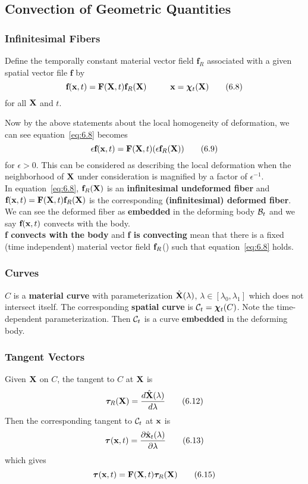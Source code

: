 \documentclass{article}
\newcommand{\Chi}{\boldsymbol{\chi}}
\begin{document}
\subsection{Convection of Geometric Quantities} 
\subsubsection{Infinitesimal Fibers}Define the temporally constant material vector field $\textbf{f}_R$ associated with a given spatial vector file $\textbf{f}$ by
\[
\textbf{f}(\x,t) = \F(\X,t)\textbf{f}_R(\X) \hspace{1cm} \x = \Chi_t(\X) \tag{6.8} \label{eq:6.8}
\]
 for all $\textbf{X}$ and $t$.

Now by the above statements about the local homogeneity of deformation, we can see 
equation~\ref{eq:6.8} becomes
\[
\epsilon\textbf{f}(\textbf{x},t) = \textbf{F}(\textbf{X},t)(\epsilon\textbf{f}_R(\textbf{X})) \tag{6.9} \label{eq:6.9}
\] 
for $\epsilon > 0$. This can be considered as describing the local deformation when the neighborhood of $\textbf{X}$ under consideration is magnified by a factor of $\epsilon^{-1}$.\\

In equation~\ref{eq:6.8}, $\textbf{f}_R(\textbf{X})$ is an \textbf{infinitesimal undeformed fiber} and $\textbf{f}(\textbf{x},t) = \textbf{F}(\textbf{X}, t)\textbf{f}_R(\textbf{X})$ is the corresponding \textbf{(infinitesimal) deformed fiber}. We can see the deformed fiber as \textbf{embedded} in the deforming body $\mathcal{B}_t$ and we say $\textbf{f}(\textbf{x},t)$ convects with the body.\\

\textbf{f convects with the body} and \textbf{f is convecting} mean that there is a fixed (time independent) material vector field $\textbf{f}_R$(\X) such that equation~\ref{eq:6.8} holds.\\

\subsubsection{Curves}
$C$ is a \textbf{material curve} with parameterization $\hat{\textbf{X}}(\lambda)$, $\lambda\in [\lambda_0,\lambda_1]$ which does not intersect itself. The corresponding \textbf{spatial curve} is $\curly{C}_t = \Chi_t(C)$. Note the time-dependent parameterization. Then $\mathcal{C}_t$ is a curve \textbf{embedded} in the deforming body.

\subsubsection{Tangent Vectors}
Given $\textbf{X}$ on $C$, the tangent to $C$ at $\textbf{X}$ is
\[
\boldsymbol{\tau}_R(\textbf{X}) = \frac{d\hat{\textbf{X}}(\lambda)}{d\lambda} \tag{6.12} \label{eq:6.12}
\]
Then the corresponding tangent to $\mathcal{C}_t$ at $\textbf{x}$ is
\[
\boldsymbol{\tau}(\textbf{x},t)= \frac{\partial \hat{\textbf{x}}_t(\lambda)}{\partial\lambda} \tag{6.13}\label{eq:6.13}
\]
which gives
\[
\boldsymbol{\tau}(\textbf{x},t) = \textbf{F}(\textbf{X},t)\boldsymbol{\tau}_R(\textbf{X}) \tag{6.15}\label{eq:6.15}
\]
\end{document}
